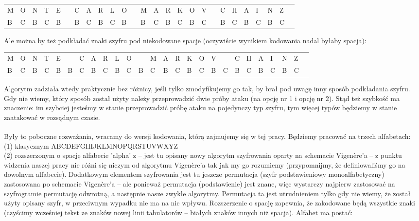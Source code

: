 \documentclass[a4paper]{article}
\theoremstyle{defn}
\theoremstyle{theorem}
\theoremstyle{lemma}
\theoremstyle{cor}
\theoremstyle{fact}
\begin{document}
\begin{center}\begin{tabular}{|p{1.5mm}|p{1.5mm}|p{1.5mm}|p{1.5mm}|p{1.5mm}|p{1.5mm}|p{1.5mm}|p{1.5mm}|p{1.5mm}|p{1.5mm}|p{1.5mm}|p{1.5mm}|p{1.5mm}|p{1.5mm}|p{1.5mm}|p{1.5mm}|p{1.5mm}|p{1.5mm}|p{1.5mm}|p{1.5mm}|p{1.5mm}|p{1.5mm}|p{1.5mm}|p{1.5mm}|p{1.5mm}|p{1.5mm}|}
    M & O & N & T & E & & C & A & R & L & O & & M & A & R & K & O & V & & C & H & A & I & N & Z \\
    B & C & B & C & B & & B & C & B & C & B & & B & C & B & C & B & C & & B & C & B & C & B & C
\end{tabular}
\end{center}
Ale można by też podkładać znaki szyfru pod niekodowane spacje (oczywiście wynikiem kodowania nadal byłaby spacja):\\
\begin{center}\begin{tabular}{|p{1.5mm}|p{1.5mm}|p{1.5mm}|p{1.5mm}|p{1.5mm}|p{1.5mm}|p{1.5mm}|p{1.5mm}|p{1.5mm}|p{1.5mm}|p{1.5mm}|p{1.5mm}|p{1.5mm}|p{1.5mm}|p{1.5mm}|p{1.5mm}|p{1.5mm}|p{1.5mm}|p{1.5mm}|p{1.5mm}|p{1.5mm}|p{1.5mm}|p{1.5mm}|p{1.5mm}|p{1.5mm}|p{1.5mm}|}
    M & O & N & T & E & & C & A & R & L & O & & M & A & R & K & O & V & & C & H & A & I & N & Z \\
    B & C & B & C & B & B & C & B & C & B & C & B & C & B & C & B & C & B & C & B & C & B & C & B & C
\end{tabular}
\end{center}
Algorytm zadziała wtedy praktycznie bez różnicy, jeśli tylko zmodyfikujemy go tak, by brał pod uwagę inny sposób podkładania szyfru. Gdy nie wiemy, który sposób został użyty należy przeprowadzić dwie próby ataku (na opcję nr 1 i opcję nr 2). Stąd też szybkość ma znaczenie: im szybciej jesteśmy w stanie przeprowadzić próbę ataku na pojedynczy typ szyfru, tym więcej typów będziemy w stanie zaatakować w rozsądnym czasie.\\\\
Były to poboczne rozważania, wracamy do wersji kodowania, którą zajmujemy się w tej pracy.
Będziemy pracować na trzech alfabetach:\\
(1) klasycznym ABCDEFGHIJKLMNOPQRSTUVWXYZ\\
(2) rozszerzonym o spację alfabecie 'alpha' z \cite{alphaqwerty} – jest tu opisany nowy algorytm szyfrowania oparty na schemacie Vigenère'a – z punktu widzenia naszej pracy nie różni się niczym od algorytmu Vigenère'a tak jak my go rozumiemy (przypomnijmy, że definiowaliśmy go na dowolnym alfabecie). Dodatkowym elementem szyfrowania jest tu jeszcze permutacja (szyfr podstawieniowy monoalfabetyczny) zastosowana po schemacie Vigenère'a – ale ponieważ permutacja (podstawienie) jest znane, więc wystarczy najpierw zastosować na szyfrogramie permutację odwrotną, a następnie nasze zwykłe algorytmy. Permutacja ta jest utrudnieniem tylko gdy nie wiemy, że został użyty opisany szyfr, w przeciwnym wypadku nie ma na nic wpływu. Rozszerzenie o spację zapewnia, że zakodowane będą wszystkie znaki (czyścimy wcześniej tekst ze znaków nowej linii tabulatorów – białych znaków innych niż spacja). Alfabet ma postać:\\
\end{document}
